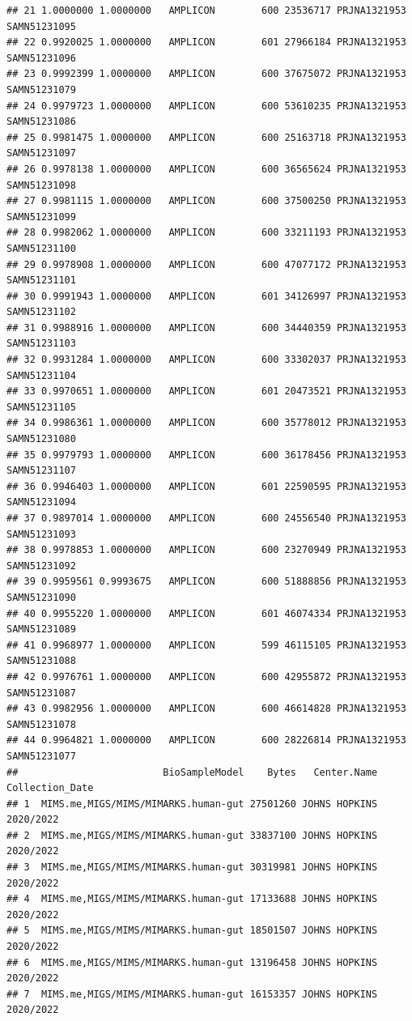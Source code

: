 \documentclass[
]{article}
\begin{document}
\begin{verbatim}
## 21 1.0000000 1.0000000   AMPLICON        600 23536717 PRJNA1321953 SAMN51231095
## 22 0.9920025 1.0000000   AMPLICON        601 27966184 PRJNA1321953 SAMN51231096
## 23 0.9992399 1.0000000   AMPLICON        600 37675072 PRJNA1321953 SAMN51231079
## 24 0.9979723 1.0000000   AMPLICON        600 53610235 PRJNA1321953 SAMN51231086
## 25 0.9981475 1.0000000   AMPLICON        600 25163718 PRJNA1321953 SAMN51231097
## 26 0.9978138 1.0000000   AMPLICON        600 36565624 PRJNA1321953 SAMN51231098
## 27 0.9981115 1.0000000   AMPLICON        600 37500250 PRJNA1321953 SAMN51231099
## 28 0.9982062 1.0000000   AMPLICON        600 33211193 PRJNA1321953 SAMN51231100
## 29 0.9978908 1.0000000   AMPLICON        600 47077172 PRJNA1321953 SAMN51231101
## 30 0.9991943 1.0000000   AMPLICON        601 34126997 PRJNA1321953 SAMN51231102
## 31 0.9988916 1.0000000   AMPLICON        600 34440359 PRJNA1321953 SAMN51231103
## 32 0.9931284 1.0000000   AMPLICON        600 33302037 PRJNA1321953 SAMN51231104
## 33 0.9970651 1.0000000   AMPLICON        601 20473521 PRJNA1321953 SAMN51231105
## 34 0.9986361 1.0000000   AMPLICON        600 35778012 PRJNA1321953 SAMN51231080
## 35 0.9979793 1.0000000   AMPLICON        600 36178456 PRJNA1321953 SAMN51231107
## 36 0.9946403 1.0000000   AMPLICON        601 22590595 PRJNA1321953 SAMN51231094
## 37 0.9897014 1.0000000   AMPLICON        600 24556540 PRJNA1321953 SAMN51231093
## 38 0.9978853 1.0000000   AMPLICON        600 23270949 PRJNA1321953 SAMN51231092
## 39 0.9959561 0.9993675   AMPLICON        600 51888856 PRJNA1321953 SAMN51231090
## 40 0.9955220 1.0000000   AMPLICON        601 46074334 PRJNA1321953 SAMN51231089
## 41 0.9968977 1.0000000   AMPLICON        599 46115105 PRJNA1321953 SAMN51231088
## 42 0.9976761 1.0000000   AMPLICON        600 42955872 PRJNA1321953 SAMN51231087
## 43 0.9982956 1.0000000   AMPLICON        600 46614828 PRJNA1321953 SAMN51231078
## 44 0.9964821 1.0000000   AMPLICON        600 28226814 PRJNA1321953 SAMN51231077
##                         BioSampleModel    Bytes   Center.Name Collection_Date
## 1  MIMS.me,MIGS/MIMS/MIMARKS.human-gut 27501260 JOHNS HOPKINS       2020/2022
## 2  MIMS.me,MIGS/MIMS/MIMARKS.human-gut 33837100 JOHNS HOPKINS       2020/2022
## 3  MIMS.me,MIGS/MIMS/MIMARKS.human-gut 30319981 JOHNS HOPKINS       2020/2022
## 4  MIMS.me,MIGS/MIMS/MIMARKS.human-gut 17133688 JOHNS HOPKINS       2020/2022
## 5  MIMS.me,MIGS/MIMS/MIMARKS.human-gut 18501507 JOHNS HOPKINS       2020/2022
## 6  MIMS.me,MIGS/MIMS/MIMARKS.human-gut 13196458 JOHNS HOPKINS       2020/2022
## 7  MIMS.me,MIGS/MIMS/MIMARKS.human-gut 16153357 JOHNS HOPKINS       2020/2022

\end{verbatim}
\end{document}
